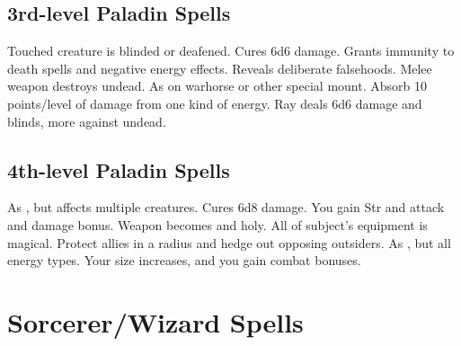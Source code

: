 \subsection{3rd-level Paladin Spells}
\begin{spelllist} 
   Touched creature is blinded or deafened.
   Cures 6d6 damage.
   Grants immunity to death spells and negative energy effects.
   Reveals deliberate falsehoods.
   Melee weapon destroys undead.
   As  on warhorse or other special mount.
   Absorb 10 points/level of damage from one kind of energy.
   Ray deals 6d6 damage and blinds, more against undead.
\end{spelllist}

\subsection{4th-level Paladin Spells}
\begin{spelllist}
   As , but affects multiple creatures.
   Cures 6d8 damage.
   You gain  Str and attack and damage bonus.
   Weapon becomes  and holy.
   All of subject's equipment is magical.
   Protect allies in a \areamed radius and hedge out opposing outsiders.
   As , but all energy types. 
   Your size increases, and you gain combat bonuses.
\end{spelllist}

\section{Sorcerer/Wizard Spells}\label{Sorcerer/Wizard Spells}
